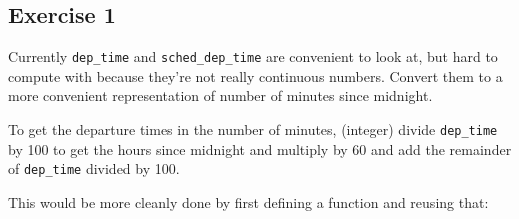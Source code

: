 \documentclass[]{book}
\newenvironment{Shaded}{\begin{snugshade}}{\end{snugshade}}
\newcommand{\CommentTok}[1]{\textcolor[rgb]{0.56,0.35,0.01}{\textit{#1}}}
\newcommand{\DataTypeTok}[1]{\textcolor[rgb]{0.13,0.29,0.53}{#1}}
\newcommand{\DecValTok}[1]{\textcolor[rgb]{0.00,0.00,0.81}{#1}}
\newcommand{\KeywordTok}[1]{\textcolor[rgb]{0.13,0.29,0.53}{\textbf{#1}}}
\newcommand{\NormalTok}[1]{#1}
\newcommand{\OperatorTok}[1]{\textcolor[rgb]{0.81,0.36,0.00}{\textbf{#1}}}
\newcommand{\StringTok}[1]{\textcolor[rgb]{0.31,0.60,0.02}{#1}}
\theoremstyle{definition}
\theoremstyle{definition}
\theoremstyle{definition}
\theoremstyle{remark}
\begin{document}
\hypertarget{exercise-1-4}{%
\subsection{Exercise 1}\label{exercise-1-4}}

Currently \texttt{dep\_time} and \texttt{sched\_dep\_time} are
convenient to look at, but hard to compute with because they're not
really continuous numbers. Convert them to a more convenient
representation of number of minutes since midnight.

To get the departure times in the number of minutes, (integer) divide
\texttt{dep\_time} by 100 to get the hours since midnight and multiply
by 60 and add the remainder of \texttt{dep\_time} divided by 100.

\begin{Shaded}
\end{Shaded}

This would be more cleanly done by first defining a function and reusing
that:
\end{document}
